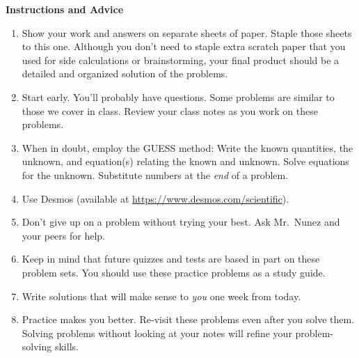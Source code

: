 \documentclass{exam}
\begin{document}
\begin{questions}
\clearpage

\textbf{Instructions and Advice}
\begin{enumerate}
\setlength\itemsep{0.1ex}
    \item Show your work and answers on separate sheets of paper. Staple those sheets to this one. Although you don't need to staple extra scratch paper that you used for side calculations or brainstorming, your final product should be a detailed and organized solution of the problems.
    \item Start early. You'll probably have questions. Some problems are similar to those we cover in class. Review your class notes as you work on these problems.
    \item When in doubt, employ the GUESS method: Write the known quantities, the unknown, and equation(s) relating the known and unknown. Solve equations for the unknown. Substitute numbers at the \textit{end} of a problem.
    \item Use Desmos (available at \href{https://www.desmos.com/scientific}{https://www.desmos.com/scientific}).
    \item Don't give up on a problem without trying your best. Ask Mr.~Nunez and your peers for help.
    \item Keep in mind that future quizzes and tests are based in part on these problem sets. You should use these practice problems as a study guide.
    \item Write solutions that will make sense to \textit{you} one week from today.
    \item Practice makes you better. Re-visit these problems even after you solve them. Solving problems without looking at your notes will refine your problem-solving skills.
\end{enumerate}






\end{questions}
\end{document}
